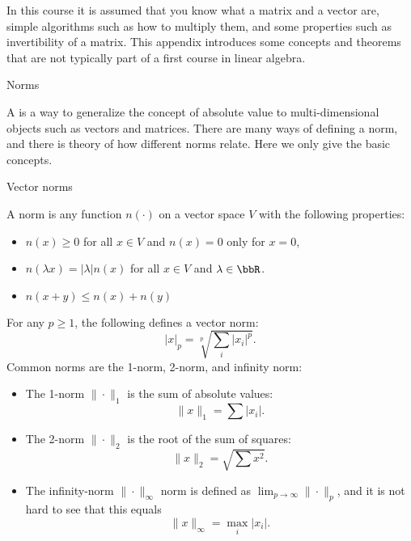
In this course it is assumed that you know what a matrix and a vector
are, simple algorithms such as how to multiply them, and some
properties such as invertibility of a matrix. This appendix introduces
some concepts and theorems that are not typically part of a first
course in linear algebra.

 {Norms}

A  is a way to generalize the concept of absolute
value to multi-dimensional objects such as vectors and matrices. There
are many ways of defining a norm, and there is theory of how different
norms relate. Here we only give the basic concepts.

 {Vector norms}

A norm is any function $n(\cdot)$ on a vector space $V$ with the
following properties:
\begin{itemize}
\item $n(x)\geq0$ for all $x\in V$ and $n(x)=0$ only for $x=0$,
\item $n(\lambda x)=|\lambda|n(x)$ for all $x\in V$ and
  $\lambda\in\bbR$.
\item $n(x+y)\leq n(x)+n(y)$
\end{itemize}
For any $p\geq1$, the following defines a vector norm:
\[ |x|_p = \sqrt[p]{\sum_i|x_i|^p}. \]
Common norms are the 1-norm, 2-norm, and infinity norm:
\begin{itemize}
\item
  The 1-norm
  $\|\cdot\|_1$ is the sum of absolute values:
  \[ \| x\|_1 = \sum |x_i|. \]
\item The 2-norm
  $\|\cdot\|_2$ is the root of the sum of squares:
  \[ \| x\|_2 = \sqrt{ \sum x^2}. \]
\item The infinity-norm
  $\|\cdot\|_\infty$ norm is defined as
  $\lim_{p\rightarrow\infty}\|\cdot\|_p$, and it is not hard to see that
  this equals
  \[ \|x\|_\infty=\max_i |x_i|. \]
\end{itemize}


